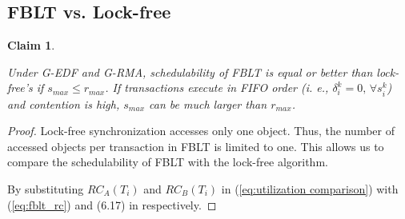 \documentclass[12pt,english]{report}
\newtheorem{clm}{Claim}
\newtheorem{proof}{Proof}
\begin{document}
\subsection{FBLT vs. Lock-free}

\begin{clm}\label{clm:fblt_edf_lock-free}

Under G-EDF and G-RMA, schedulability of FBLT is equal or better than
lock-free's if $s_{max}\le r_{max}$. If transactions execute in FIFO
order (i. e., $\delta_{i}^{k}=0,\,\forall s_{i}^{k}$) and contention
is high, $s_{max}$ can be much larger than $r_{max}$.

\end{clm}

\begin{proof}

Lock-free synchronization \cite{key-5,stmconcurrencycontrol:emsoft11}
accesses only one object. Thus, the number of accessed objects per
transaction in FBLT is limited to one. This allows us to compare the
schedulability of FBLT with the lock-free algorithm.

By substituting $RC_{A}(T_{i})$ and $RC_{B}(T_{i})$ in (\ref{eq:utilization comparison})
with (\ref{eq:fblt_rc}) and (6.17) in \cite{shambake_phd_proposal}
respectively. 


\end{proof}
\end{document}
